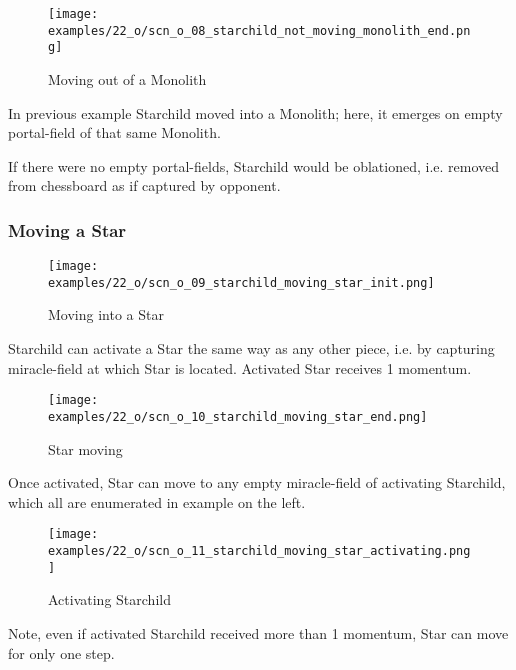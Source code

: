 \vspace*{5.1\baselineskip}
\noindent
\begin{wrapfigure}[8]{l}{0.4\textwidth}
\centering
\texttt{[image: examples/22\_o/scn\_o\_08\_starchild\_not\_moving\_monolith\_end.png]}
\caption{Moving out of a Monolith}
\label{fig:scn_o_08_starchild_not_moving_monolith_end}
\end{wrapfigure}
In previous example Starchild moved into a Monolith; here, it emerges on empty
portal-field of that same Monolith.

If there were no empty portal-fields, Starchild would be oblationed, i.e. removed
from chessboard as if captured by opponent.

\clearpage %

\subsubsection*{Moving a Star}
\label{sec:One/Starchild/Movement/Moving a Star}

\noindent
\begin{wrapfigure}[5]{l}{0.4\textwidth}
\centering
\texttt{[image: examples/22\_o/scn\_o\_09\_starchild\_moving\_star\_init.png]}
\caption{Moving into a Star}
\label{fig:scn_o_09_starchild_moving_star_init}
\end{wrapfigure}
Starchild can activate a Star the same way as any other piece, i.e. by capturing
miracle-field at which Star is located. Activated Star receives 1 momentum.

\vspace*{2.1\baselineskip}
\noindent
\begin{wrapfigure}[4]{l}{0.4\textwidth}
\centering
\texttt{[image: examples/22\_o/scn\_o\_10\_starchild\_moving\_star\_end.png]}
\caption{Star moving}
\label{fig:scn_o_10_starchild_moving_star_end}
\end{wrapfigure}
Once activated, Star can move to any empty miracle-field of activating Starchild,
which all are enumerated in example on the left.

\vspace*{2.3\baselineskip}
\noindent
\begin{wrapfigure}[8]{l}{0.4\textwidth}
\centering
\texttt{[image: examples/22\_o/scn\_o\_11\_starchild\_moving\_star\_activating.png]}
\caption{Activating Starchild}
\label{fig:scn_o_11_starchild_moving_star_activating}
\end{wrapfigure}
Note, even if activated Starchild received more than 1 momentum, Star can move for
only one step.

